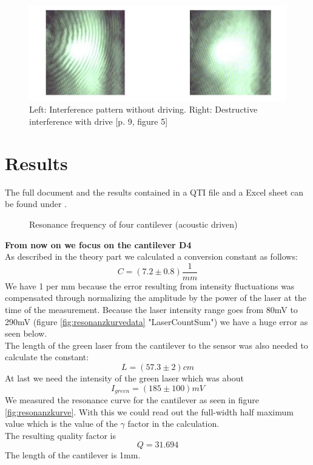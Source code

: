 \documentclass[12pt,a4paper]{article}
\begin{document}
\begin{multicols}{2}
\begin{figure}[H]
	\centering
	\includegraphics[scale=0.6]{../figures/interference.png}
	\caption{Left: Interference pattern without driving. Right: Destructive interference with drive \cite{physikwiki}[p. 9, figure 5]}
	\label{fig:pattern}
\end{figure}
\section{Results}
The full document and the results contained in a QTI file and a Excel sheet can be found under \cite{github}.

\begin{figure}[H]
 \centering
 \caption{Resonance frequency of four cantilever (acoustic driven)}
 \label{tab:acoustic_resonance}
\end{figure}

\textbf{From now on we focus on the cantilever D4}\\
As described in the theory part we calculated a conversion constant as follows:
$$C = (7.2 \pm 0.8) \frac{1}{mm}$$
We have 1 per mm because the error resulting from intensity fluctuations was compensated through normalizing the amplitude by the power of the laser at the time of the measurement. Because the laser intensity range goes from 80mV to 290mV (figure \ref{fig:resonanzkurvedata} "LaserCountSum") we have a huge error as seen below.\\
The length of the green laser from the cantilever to the sensor was also needed to calculate the constant:
$$L = (57.3 \pm 2)cm$$
At last we need the intensity of the green laser which was about 
$$I_{green} = (185 \pm 100)mV$$
We measured the resonance curve for the cantilever as seen in figure \ref{fig:resonanzkurve}.
With this we could read out the full-width half maximum value which is the value of the $\gamma$ factor in the calculation.\\
The resulting quality factor is
$$Q = 31.694$$
The length of the cantilever is 1mm.


\end{multicols}
\end{document}
